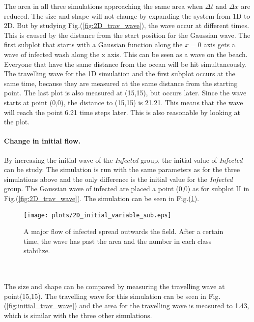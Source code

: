 \documentclass[%
twoside,                 %
final,                   %
10pt]{article}
\begin{document}
\noindent
The area in all three simulations approaching the same area when $\Delta t$ and $\Delta x$ are reduced. The size and shape will not change by  expanding the system from 1D to 2D. But by studying Fig.(\ref{fig:2D_trav_wave}), the wave occur at different times. This is caused by the distance from the start position for the Gaussian wave. The first subplot that starts with a Gaussian function along the $x=0$ axis gets a wave of infected wash along the x axis. This can be seen as a wave on the beach. Everyone that have the same distance from the ocean will be hit simultaneously. The travelling wave for the 1D simulation and the first subplot occurs at the same time, because they are measured at the same distance from the starting point. The last plot is also measured at (15,15), but occurs later. Since the wave starts at point (0,0), the distance to (15,15) is 21.21. This means that the wave will reach the point 6.21 time steps later. This is also reasonable by looking at the plot.    

\paragraph{Change in initial flow.}
By increasing the initial wave of the \emph{Infected} group, the initial value of \emph{Infected} can be study. The simulation is run with the same parameters as for the three simulations above and the only difference is the initial value for the \emph{Infected} group. The Gaussian wave of infected are placed a point (0,0) as for subplot II in Fig.(\ref{fig:2D_trav_wave}). The simulation can be seen in Fig.(\ref{fig:initial_value}).  


\begin{figure}[ht]
  \centerline{\texttt{[image: plots/2D\_initial\_variable\_sub.eps]}}
  \caption{
  \label{fig:initial_value} A major flow of infected spread outwards the field. After a certain time, the wave has past the area and the number in each class stabilize.
  }
\end{figure}


\\
\\
The size and shape can be compared by measuring the travelling wave at point(15,15). The travelling wave for this simulation can be seen in Fig.(\ref{fig:initial_trav_wave}) and the area for the travelling wave is measured to 1.43, which is similar with the three other simulations.
\end{document}
